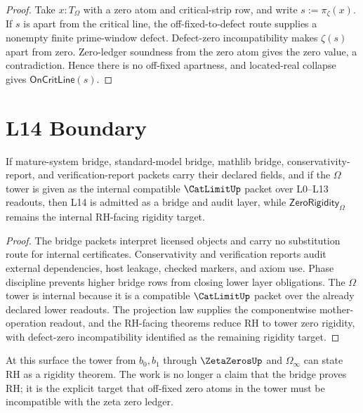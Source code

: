 \begin{proof}
Take $x:T_{\Omega}$ with a zero atom and critical-strip row, and write
$s:=\pi_{\zeta}(x)$.  If $s$ is apart from the critical line, the
off-fixed-to-defect route supplies a nonempty finite prime-window defect.
Defect-zero incompatibility makes $\zeta(s)$ apart from zero.  Zero-ledger
soundness from the zero atom gives the zero value, a contradiction.  Hence
there is no off-fixed apartness, and located-real collapse gives
$\mathsf{OnCritLine}(s)$.
\end{proof}

\section{L14 Boundary}
\label{sec:mature-bridge-spine-boundary-theorem}

\begin{theorem}
\label{thm:mature-bridge-spine-admission}
If mature-system bridge, standard-model bridge, mathlib bridge,
conservativity-report, and verification-report packets carry their declared
fields, and if the $\Omega$ tower is given as the internal compatible
$\CatLimitUp$ packet over L0--L13 readouts, then L14 is admitted as a bridge
and audit layer, while $\mathsf{ZeroRigidity}_{\Omega}$ remains the internal
RH-facing rigidity target.
\end{theorem}

\begin{proof}
The bridge packets interpret licensed objects and carry no substitution route
for internal certificates.  Conservativity and verification reports audit
external dependencies, host leakage, checked markers, and axiom use.  Phase
discipline prevents higher bridge rows from closing lower layer obligations.
The $\Omega$ tower is internal because it is a compatible $\CatLimitUp$ packet
over the already declared lower readouts.  The projection law supplies the
componentwise mother-operation readout, and the RH-facing theorems reduce RH
to tower zero rigidity, with defect-zero incompatibility identified as the
remaining rigidity target.
\end{proof}

\begin{principle}
\label{prin:mature-bridge-spine-final-boundary}
At this surface the tower from $b_0,b_1$ through $\ZetaZerosUp$ and
$\Omega_{\infty}$ can state RH as a rigidity theorem.  The work is no longer a
claim that the bridge proves RH; it is the explicit target that off-fixed zero
atoms in the tower must be incompatible with the zeta zero ledger.
\end{principle}

